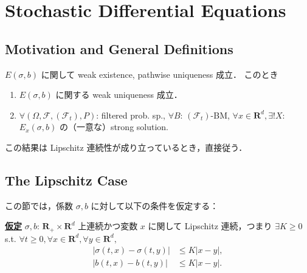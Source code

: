 \documentclass{jsarticle}
\title{}
\author{}
\date{
}
\begin{document}
\setcounter{section}{7}
\section{Stochastic Differential Equations}
\subsection{Motivation and General Definitions}

\begin{screen}
    \begin{thm*}
        $E(\sigma, b)$ に関して weak existence, pathwise uniqueness 成立．
        このとき
        \begin{enumerate}[label=(\roman*)]
            \item
            $E(\sigma, b)$ に関する weak uniqueness 成立．
            \item
            $\forall (\Omega, \mathcal{F}, (\mathcal{F}_t), P)$: filtered prob. sp., $\forall B$: $(\mathcal{F}_t)$-BM, $\forall x\in\mathbf{R}^d, \exists! X$: $E_x(\sigma, b)$ の（一意な）strong solution.
        \end{enumerate}
    \end{thm*}
\end{screen}

この結果は Lipschitz 連続性が成り立っているとき，直接従う．

\subsection{The Lipschitz Case}

この節では，係数 $\sigma, b$ に対して以下の条件を仮定する：
\begin{screen}
    \textbf{\underline{仮定} }
    $\sigma, b$: $\mathbf{R_+}\times\mathbf{R}^d$ 上連続かつ変数 $x$ に関して Lipschitz 連続，つまり $\exists K\ge0$ s.t. $\forall t\ge0, \forall x\in\mathbf{R}^d, \forall y\in\mathbf{R}^d,$
    \begin{align}
        \left\lvert\sigma(t, x)-\sigma(t, y)\right\rvert
        &\le K\left\lvert x-y\right\rvert, \\
        \left\lvert b(t, x)-b(t, y)\right\rvert
        &\le K\left\lvert x-y\right\rvert.
    \end{align}
\end{screen}
\end{document}
